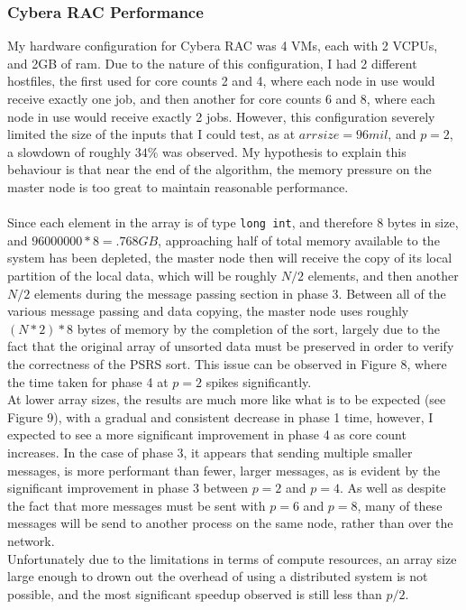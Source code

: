 \documentclass[11pt]{report}
\begin{document}
\subsubsection*{Cybera RAC Performance}
My hardware configuration for Cybera RAC was 4 VMs, each with 2 VCPUs, and 2GB of ram. Due to the nature of this configuration, I had 2 different hostfiles, the first used 
for core counts 2 and 4, where each node in use would receive exactly one job, and then another for core counts 6 and 8, where each node in use would receive exactly 2 jobs.
However, this configuration severely limited the size of the inputs that I could test, as at $arr size=96mil$, and $p=2$, a slowdown of roughly $34\%$ was observed. My
hypothesis to explain this behaviour is that near the end of the algorithm, the memory pressure on the master node is too great to maintain reasonable performance.\\\\
Since each element in the array is of type \verb|long int|, and therefore 8 bytes in size, and $96000000* 8 = .768 GB$, approaching half of total memory available to the 
system has been depleted, the master node then will receive the copy of its local partition of the local data, which will be roughly $N/2$ elements, and then another $N/2$
elements during the message passing section in phase 3. Between all of the various message passing and data copying, the master node uses roughly $(N*2) * 8$ bytes of 
memory by the completion of the sort, largely due to the fact that the original array of unsorted data must be preserved in order to verify the correctness of the
PSRS sort. This issue can be observed in Figure 8, where the time taken for phase 4 at $p=2$ spikes significantly.\\
At lower array sizes, the results are much more like what is to be expected (see Figure 9), with a gradual and consistent decrease in phase 1 time, however, I expected to see a more significant improvement in phase 4 as core count increases. In the case of phase 3, it appears that sending multiple smaller
messages, is more performant than fewer, larger messages, as is evident by the significant improvement in phase 3 between $p=2$ and $p=4$. As well as despite the fact that more
messages must be sent with $p=6$ and $p=8$, many of these messages will be send to another process on the same node, rather than over the network.\\
Unfortunately due to the limitations in terms of compute resources, an array size large enough to drown out the overhead of using a distributed system is not possible, and the most significant speedup observed is still less than $p/2$.
\end{document}
